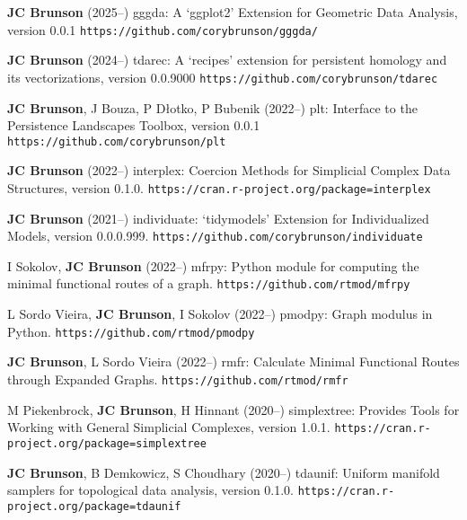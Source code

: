 \documentclass[10pt,a4paper]{article}
\begin{document}
\begin{enumerate}[label={[\arabic*]},labelindent=1cm,nolistsep]
\setcounter{enumi}{\value{paper}}
\item
{\bfseries JC Brunson} (2025--) {\sffamily gggda}: A `ggplot2' Extension for Geometric Data Analysis, version 0.0.1 {\tt\small\nolinkurl{https://github.com/corybrunson/gggda/}}
\item
{\bfseries JC Brunson} (2024--) {\sffamily tdarec}: A `recipes' extension for persistent homology and its vectorizations, version 0.0.9000 {\tt\small\nolinkurl{https://github.com/corybrunson/tdarec}}
\item
{\bfseries JC Brunson}, J Bouza, P Dłotko, P Bubenik (2022--) {\sffamily plt}: Interface to the Persistence Landscapes Toolbox, version 0.0.1 {\tt\small\nolinkurl{https://github.com/corybrunson/plt}}
\item
{\bfseries JC Brunson} (2022--) {\sffamily interplex}: Coercion Methods for Simplicial Complex Data Structures, version 0.1.0. {\tt\small\nolinkurl{https://cran.r-project.org/package=interplex}}
\item
{\bfseries JC Brunson} (2021--) {\sffamily individuate}: `tidymodels' Extension for Individualized Models, version 0.0.0.999. {\tt\small\nolinkurl{https://github.com/corybrunson/individuate}}
\item
I Sokolov, {\bfseries JC Brunson} (2022--) {\sffamily mfrpy}: Python module for computing the minimal functional routes of a graph. {\tt\small\nolinkurl{https://github.com/rtmod/mfrpy}}
\item
L Sordo Vieira, {\bfseries JC Brunson}, I Sokolov (2022--) {\sffamily pmodpy}: Graph modulus in Python. {\tt\small\nolinkurl{https://github.com/rtmod/pmodpy}}
\item
{\bfseries JC Brunson}, L Sordo Vieira (2022--) {\sffamily rmfr}: Calculate Minimal Functional Routes through Expanded Graphs. {\tt\small\nolinkurl{https://github.com/rtmod/rmfr}}
\item
M Piekenbrock, {\bfseries JC Brunson}, H Hinnant (2020--) {\sffamily simplextree}: Provides Tools for Working with General Simplicial Complexes, version 1.0.1. {\tt\small\nolinkurl{https://cran.r-project.org/package=simplextree}}
\item
{\bfseries JC Brunson}, B Demkowicz, S Choudhary (2020--) {\sffamily tdaunif}: Uniform manifold samplers for topological data analysis, version 0.1.0. {\tt\small\nolinkurl{https://cran.r-project.org/package=tdaunif}}

\end{enumerate}
\end{document}
